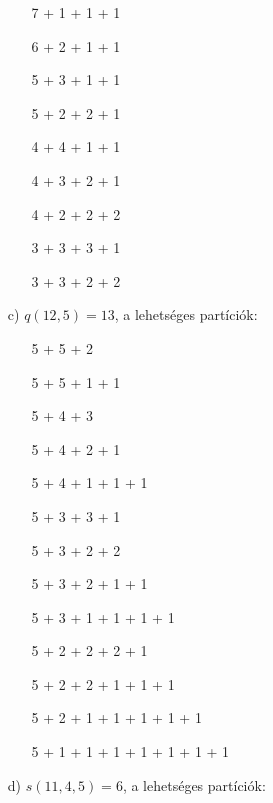 \begin{solution}
\begin{enumerate}
\begin{minipage}[c]{0.3\textwidth}%
 \hspace{0cm} 
\begin{itemize}
\item[] 7 + 1 + 1 + 1 
\item[] 6 + 2 + 1 + 1 
\item[] 5 + 3 + 1 + 1 
\item[] 5 + 2 + 2 + 1 
\end{itemize}
\hspace{0cm} %
\end{minipage}%
\begin{minipage}[c]{0.45\textwidth}%
 \hspace{0cm} 
\begin{itemize}
\item[] 4 + 4 + 1 + 1 
\item[] 4 + 3 + 2 + 1 
\item[] 4 + 2 + 2 + 2 
\item[] 3 + 3 + 3 + 1 
\item[] 3 + 3 + 2 + 2 
\end{itemize}
\hspace{0cm} %
\end{minipage}
\item[c)] $q(12,5)=13$, a lehetséges partíciók:

\begin{minipage}[c]{0.34\textwidth}%
 \hspace{0cm} 
\begin{itemize}
\item[] 5 + 5 + 2 
\item[] 5 + 5 + 1 + 1 
\item[] 5 + 4 + 3 
\item[] 5 + 4 + 2 + 1 
\item[] 5 + 4 + 1 + 1 + 1 
\item[] 5 + 3 + 3 + 1 
\item[] 5 + 3 + 2 + 2 
\end{itemize}
\hspace{0cm} %
\end{minipage}%
\begin{minipage}[c]{0.49\textwidth}%
 \hspace{0cm} 
\begin{itemize}
\item[] 5 + 3 + 2 + 1 + 1 
\item[] 5 + 3 + 1 + 1 + 1 + 1 
\item[] 5 + 2 + 2 + 2 + 1 
\item[] 5 + 2 + 2 + 1 + 1 + 1 
\item[] 5 + 2 + 1 + 1 + 1 + 1 + 1 
\item[] 5 + 1 + 1 + 1 + 1 + 1 + 1 + 1 
\end{itemize}
\hspace{0cm} %
\end{minipage}
\item[d)] $s(11,4,5)=6$, a lehetséges partíciók:


\end{enumerate}
\end{solution}
